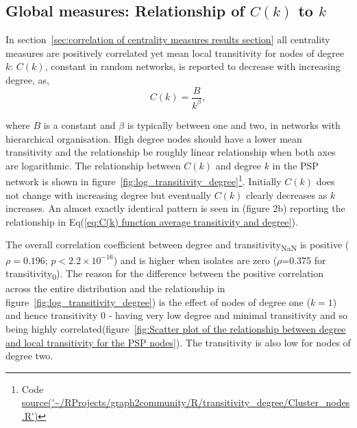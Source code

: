 


 
  
\subsection{Global measures: Relationship of $C(k)$ to $k$}%
\label{sec:relationship of ck to k albert}

In section~\ref{sec:correlation of centrality measures results section} all centrality measures are positively correlated yet mean local transitivity for nodes of degree $k$: $C(k)$, constant in random networks, is reported to decrease with increasing degree\cite{yook2004functional},\cite{albert2005scale} as,
\begin{equation}
            C(k) = \frac{B}{k^{\beta}},
            \label{eq:C(k) function average transitivity and degree}
\end{equation}


 where $B$ is a constant and $\beta$ is typically between one and two\cite{albert2005scale},\cite{yook2004functional} in networks with hierarchical organisation. High degree nodes should have a lower mean transitivity and the relationship be roughly linear relationship when both axes are logarithmic. The relationship between $C(k)$ and degree $k$ in the PSP network  is shown in figure~\ref{fig:log_transitivity_degree}\footnote{Code \url{source('~/RProjects/graph2community/R/transitivity_degree/Cluster_nodes.R')}}. Initially $C(k)$ does not change with increasing degree but eventually $C(k)$ clearly decreases as $k$ increases. An almost exactly identical pattern is seen in\cite{yook2004functional}  (figure 2b) reporting the relationship in Eq(\ref{eq:C(k) function average transitivity and degree}). 

The overall correlation coefficient between degree and transitivity\textsubscript{NaN} is positive ($\rho= 0.196$; $p < 2.2 \times 10^{-16}$) and is higher when isolates are zero ($\rho$=0.375 for transitivity\textsubscript{0}). The reason for the difference between the positive correlation across the entire distribution and the relationship in figure~\ref{fig:log_transitivity_degree}) is the effect of nodes of degree one ($k=1$) and hence transitivity 0 - having very low degree and minimal transitivity and so being highly correlated(figure~\ref{fig:Scatter plot of the relationship between degree and local transitivity for the PSP nodes}). The transitivity is also low for nodes of degree two.



